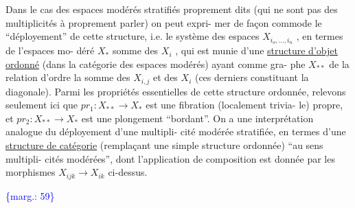 \documentclass[11pt]{article}
\newcommand{\margin}[1]{\textcolor{blue}{\{\textsf{marg.:} #1\}}}
\newcommand{\uline}[1]{\underline{#1}}
\begin{document}
Dans le cas des espaces modérés stratifiés proprement dits (qui
ne sont pas des multiplicités à proprement parler) on peut expri-%
mer de façon commode le ``déployement'' de cette structure, i.e.
le système des espaces $X_{i_o,\ldots,i_n}$ , en termes de l'espaces mo-%
déré $X_*$ somme des $X_i$ , qui est munie d'une \uline{structure d'objet}
\uline{ordonné} (dans la catégorie des espaces modérés) ayant comme gra-%
phe $X_{**}$ de la relation d'ordre la somme des $X_{i,j}$ et des $X_i$
(ces derniers constituant la diagonale). Parmi les propriétés
essentielles de cette structure ordonnée, relevons seulement
ici que $pr_1 : X_{**} \longrightarrow X_*$ est une fibration (localement trivia-%
le) propre, et $pr_2 : X_{**} \longrightarrow X_*$ est une plongement ``bordant''.
On a une interprétation analogue du déployement d'une multipli-%
cité modérée stratifiée, en termes d'une \uline{structure de catégorie}
(remplaçant une simple structure ordonnée) ``au sens multipli-%
cités modérées'', dont l'application de composition est donnée
par les morphismes $X_{ijk} \longrightarrow X_{ik}$ ci-dessus.

\margin{59}
\end{document}
